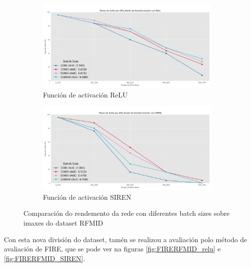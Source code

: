 \begin{figure}[ht]
    \centering
    \begin{subfigure}[b]{0.5\textwidth}
        \centering
        \includegraphics[width=\textwidth]{imaxes/batchsize/experiment_plot_RFMID_bs_relu.png}
        \caption{Función de activación ReLU}
        \label{fig:batch_size_comparison_relu_rfmid}
    \end{subfigure}\hfill
    \begin{subfigure}[b]{0.5\textwidth}
        \centering
        \includegraphics[width=\textwidth]{imaxes/batchsize/experiment_plot_RFMID_bs_siren.png}
        \caption{Función de activación SIREN}
        \label{fig:batch_size_comparison_siren_rfmid}
    \end{subfigure}
    \caption{Comparación do rendemento da rede con diferentes batch sizes sobre imaxes do dataset RFMID}
    \label{fig:batch_size_comparisons_rfmid}
\end{figure}

Con esta nova división do dataset, tamén se realizou a avaliación polo método de avaliación de FIRE, que se pode ver na figuras \ref{fig:FIRERFMID_relu} e \ref{fig:FIRERFMID_SIREN}.

